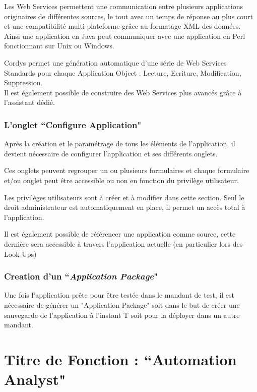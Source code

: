 Les Web Services permettent une communication entre plusieurs applications originaires de différentes sources, le tout avec un temps de réponse au plus court et une compatibilité multi-plateforme grâce au formatage XML des données.\\
Ainsi une application en Java peut communiquer avec une application en Perl fonctionnant sur Unix ou Windows.

Cordys permet une génération automatique d'une série de Web Services Standards pour chaque Application Object : Lecture, Ecriture, Modification, Suppression.\\
Il est également possible de construire des Web Services plus avancés grâce à l'assistant dédié.

\clearpage

\subsubsection{L'onglet ``Configure Application"}

Après la création et le paramétrage de tous les éléments de l'application, il devient nécessaire de configurer l'application et ses différents onglets.

Ces onglets peuvent regrouper un ou plusieurs formulaires et chaque formulaire et/ou onglet peut être accessible ou non en fonction du privilège utilisateur.

Les privilèges utilisateurs sont à créer et à modifier dans cette section. Seul le droit administrateur est automatiquement en place, il permet un accès total à l'application.

Il est également possible de référencer une application comme source, cette dernière sera accessible à travers l'application actuelle (en particulier lors des Look-Ups)

\subsubsection{Creation d'un ``\emph{Application Package}"}

Une fois l'application prête pour être testée dans le mandant de test, il est nécessaire de générer un "Application Package" soit dans le but de créer une sauvegarde de l'application à l'instant T soit pour la déployer dans un autre mandant.
\clearpage

\section{Titre de Fonction : ``Automation Analyst"}

